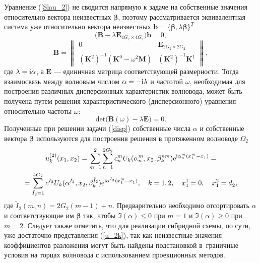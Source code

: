 \documentclass[press]{vestnik}
\begin{document}
Уравнение (\ref{Slau_2}) не сводится напрямую к задаче на собственные значения относительно вектора неизвестных $\bm{\beta}$, поэтому рассматривается эквивалентная система уже относительно вектора неизвестных $\bm{b} = \{ \bm{\beta},\lambda \bm{\beta} \}^{T}$
$$
\big( \bm{B} - \lambda \bm{E}_{4G_{2} \times 4G_{2}}^{} \big) \bm{b} = 0,
$$
$$
{\bm{B}}=
\begin{Vmatrix}
	0 								& \bm{E}_{2G_{2} \times 2G_{2}}^{}  \\[2mm]
	(\bm{K}^{2})^{-1} (\bm{K}^{0} - \omega^{2} \bm{M}) & (\bm{K}^{2})^{-1} \bm{K}^{1}
\end{Vmatrix},
$$
где $\lambda = {\rm{i}} \alpha$, а $\bm{E}$ --- единичная матрица соответствующей размерности. Тогда взаимосвязь между волновым числом $\alpha=- \rm{i} \lambda$ и частотой $\omega$, необходимая для построения различных дисперсионных характеристик волновода, может быть получена путем решения характеристического (дисперсионного) уравнения относительно частоты $\omega$:
\begin{equation} \label{disp}
\text{det} \big( \bm{B}(\omega) - \lambda \bm{E} \big) = 0.
\end{equation}
Полученные при решении задачи (\ref{disp}) собственные числа $\alpha$ и собственные вектора $\bm{\beta}$ используются для построения решения в протяженном волноводе $\Omega_{2}$
\begin{multline} \label{u_2k}
		u_{k}^{(2)}(x_1,x_2) = \sum_{m=1}^{2}\sum_{n=1}^{2G_2} c_{n}^{m} U_{k}(\alpha_{n}^{m},x_2,\beta_{k}^{nm}) \mathrm{e}^{ {\rm{i}} \alpha_{n}^{m} (x_{1}^{m}-x_{1}^{}) } = \\
		= \sum_{\tilde{I}_{2} = 1}^{4G_{2}} c^{\tilde{I}_{2}} U_{k}(\alpha^{\tilde{I}_{2}},x_2,\beta_{k}^{\tilde{I}_{2}}) \mathrm{e}^{ {\rm{i}} \alpha_{}^{\tilde{I}_{2}} (x_{1}^{m}-x_{1}^{})},\quad k=1, 2, \quad x_{1}^{1} = 0,\quad x_{1}^{2} = d_{2}^{},
\end{multline}
где $\tilde{I}_{2}(m,n)=2G_{2}(m-1)+n$. Предварительно необходимо отсортировать $\alpha$ и соответствующие им $\bm{\beta}$ так, чтобы $\Im (\alpha) \leqslant 0$ при $m=1$ и  $\Im (\alpha) \geqslant 0$ при $m=2$. Следует также отметить, что для реализации гибридной схемы, по сути, уже достаточно представления (\ref{u_2k}), так как неизвестные значения коэффициентов разложения могут быть найдены подстановкой в~граничные условия на торцах волновода с использованием проекционных методов.
\end{document}
